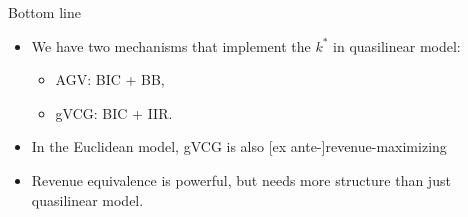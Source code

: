 \documentclass[english,10pt
,aspectratio=169
]{beamer}
\begin{document}
\begin{frame}{Bottom line}
\begin{itemize}
	\item We have two mechanisms that implement the  $k^*$ in \alert{quasilinear} model:
	\begin{itemize}
		\item AGV: BIC + BB,
		\item gVCG: BIC + IIR.
	\end{itemize}
	\item In the \alert{Euclidean} model, gVCG is also [ex ante-]revenue-maximizing
	\item Revenue equivalence is powerful, but needs more structure than just quasilinear model.
\end{itemize}
\end{frame}








\end{document}
